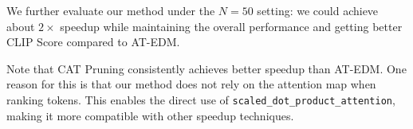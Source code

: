 \documentclass[10pt]{article}
\begin{document}
We further evaluate our method under the $N=50$ setting: we could achieve about $2\times$ speedup while maintaining the overall performance and getting better CLIP Score compared to AT-EDM\citep{wang2024atedm}.

Note that CAT Pruning consistently achieves better speedup than AT-EDM. One reason for this is that our method does not rely on the attention map when ranking tokens. This enables the direct use of \texttt{scaled\_dot\_product\_attention}, making it more compatible with other speedup techniques.



\begin{table*}[h!]
\centering
{}
\caption{Comparison of different methods on PartiPrompts and COCO2017 datasets. All methods here adopt 28 sampling steps.}
\label{tab:28}
\end{table*}
\end{document}
